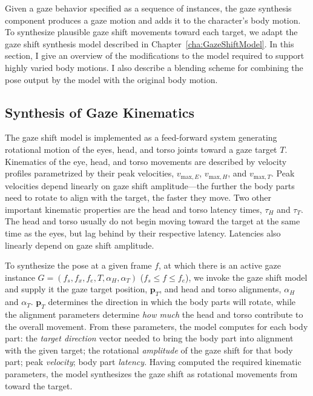 Given a gaze behavior specified as a sequence of instances, the gaze synthesis component produces a gaze motion and adds it to the character's body motion. To synthesize plausible gaze shift movements toward each target, we adapt the gaze shift synthesis model described in Chapter~\ref{cha:GazeShiftModel}. In this section, I give an overview of the modifications to the model required to support highly varied body motions. I also describe a blending scheme for combining the pose output by the model with the original body motion.

\subsection{Synthesis of Gaze Kinematics}

The gaze shift model is implemented as a feed-forward system generating rotational motion of the eyes, head, and torso joints toward a gaze target $T$. Kinematics of the eye, head, and torso movements are described by velocity profiles parametrized by their peak velocities, $v_{\mathrm{max},E}$, $v_{\mathrm{max},H}$, and $v_{\mathrm{max},T}$. Peak velocities depend linearly on gaze shift amplitude---the further the body parts need to rotate to align with the target, the faster they move. Two other important kinematic properties are the head and torso latency times, $\tau_H$ and $\tau_T$. The head and torso usually do not begin moving toward the target at the same time as the eyes, but lag behind by their respective latency. Latencies also linearly depend on gaze shift amplitude.

To synthesize the pose at a given frame $f$, at which there is an active gaze instance $G = (f_s, f_x, f_e, T, \alpha_{H}, \alpha_{T})$ ($f_s \leq f \leq f_e$), we invoke the gaze shift model and supply it the gaze target position, $\mathbf{p}_T$, and head and torso alignments, $\alpha_H$ and $\alpha_T$. $\mathbf{p}_T$ determines the direction in which the body parts will rotate, while the alignment parameters determine \emph{how much} the head and torso contribute to the overall movement. From these parameters, the model computes for each body part: the \emph{target direction} vector needed to bring the body part into alignment with the given target; the rotational \emph{amplitude} of the gaze shift for that body part; peak \emph{velocity}; body part \emph{latency}. Having computed the required kinematic parameters, the model synthesizes the gaze shift as rotational movements from toward the target.

